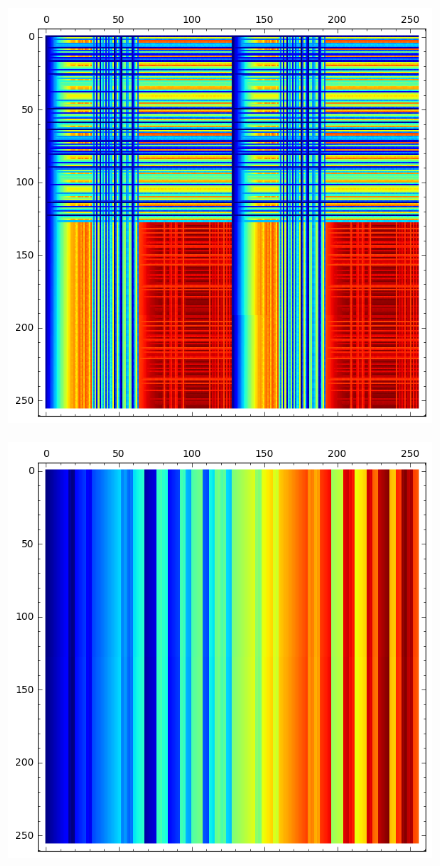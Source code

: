 \documentclass[12pt,a4paper]{article}
\begin{document}
\begin{figure}[!ht]
\centering
\begin{minipage}{.48\textwidth}
  \centering
\includegraphics[width=.9\linewidth]{../matrix_plot/cast128_2_1_bent_cayley_graph_index_matrix.png}
  \label{fig:cast128_2_1_bent_cayley_graph_index_matrix}
\end{minipage}%
\begin{minipage}{.48\textwidth}
  \centering
\includegraphics[width=.9\linewidth]{../matrix_plot/cast128_2_16_bent_cayley_graph_index_matrix.png}
  \label{fig:cast128_2_16_bent_cayley_graph_index_matrix}
\end{minipage}%
\end{figure}
\end{document}

